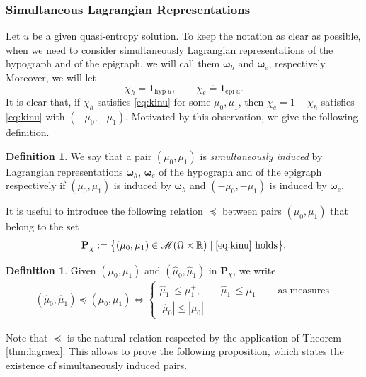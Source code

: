\documentclass[11pt, twoside, reqno]{amsart}
\theoremstyle{definition}
\newtheorem{defi}[thm]{Definition}
\theoremstyle{remark}
\numberwithin{equation}{section}
\newcommand{\mr}[1]{\mathrm{#1}}
\newcommand{\bs}[1]{\boldsymbol{#1}}
\begin{document}
\subsubsection{Simultaneous Lagrangian Representations}\label{subsec:simlagra}
Let $u$ be a given quasi-entropy solution. To keep the notation as clear as possible, when we need to consider simultaneously Lagrangian representations of the hypograph and of the epigraph, we will call them $\bs \omega_h$ and $\bs \omega_e$, respectively. Moreover, we will let
$$
\chi_h\doteq\mathbf 1_{\mr{hyp} \; u}, \qquad \chi_e\doteq \mathbf 1_{\mr{epi} \; u}.
$$
It is clear that, if $\chi_h$ satisfies \eqref{eq:kinu} for some $\mu_0, \mu_1$, then $\chi_e = 1-\chi_h$ satisfies \eqref{eq:kinu} with $(-\mu_0, -\mu_1)$. Motivated by this observation, we give the following definition.
\begin{defi}\label{defi:siminduc}
    We say that a pair $(\mu_0, \mu_1)$ is \textit{simultaneously induced} by Lagrangian representations $\bs \omega_h$, $\bs \omega_e$ of the hypograph and of the epigraph respectively if $(\mu_0, \mu_1)$ is induced by $\bs \omega_h$ and $(-\mu_0, -\mu_1)$ is induced by $\bs \omega_e$.
\end{defi}
It is useful to introduce the following relation $\preceq$ between pairs $(\mu_0, \mu_1)$ that belong to the set
\begin{equation}\label{eq:pairset}
\mathbf P_{\chi} := \big\{(\mu_0, \mu_1) \in \mathscr M(\Omega \times \mathbb R) \; | \; \text{\eqref{eq:kinu} holds}\big\}.
\end{equation}
\begin{defi}\label{defi:relation}
Given $(\mu_0, \mu_1)$ and $(\widehat \mu_0, \widehat \mu_1)$ in $\mathbf P_{\chi}$, we write 
\begin{equation}\label{eq:relation}
\begin{aligned}
    (\widehat \mu_0, \widehat \mu_1) \preceq (\mu_0,  \mu_1) \Longleftrightarrow 
        \begin{cases}
             \widehat \mu^+_1 \leq \mu^+_1, \qquad \widehat \mu^-_1 \leq \mu^-_1 \qquad \text{as measures} \\
             |\widehat \mu_0| \leq |\mu_0| 
                \end{cases}
    \end{aligned}
\end{equation}
\end{defi}
Note that $\preceq$ is the natural relation respected by the application of Theorem \ref{thm:lagraex}. This allows to prove the following proposition, which states the existence of simultaneously induced pairs.
\end{document}
